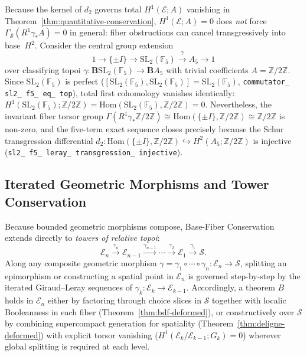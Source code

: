 \begin{remark}\label{rem:leray-transgressive-cancellation}%
%
%
Because the kernel of $d_2$ governs total $H^1(\mathcal{E}; A)$ vanishing in Theorem~\ref{thm:quantitative-conservation}, $H^1(\mathcal{E}; A) = 0$ does \emph{not} force $\Gamma_{\mathcal{S}}(R^1\gamma_* A) = 0$ in general: fiber obstructions can cancel transgressively into base~$H^2$. Consider the central group extension
\[
  1 \longrightarrow \{\pm I\} \longrightarrow \mathrm{SL}_2(\mathbb{F}_5) \xrightarrow{\;\gamma\;} A_5 \longrightarrow 1
\]
over classifying topoi $\gamma : \mathbf{B}\mathrm{SL}_2(\mathbb{F}_5) \to \mathbf{B}A_5$ with trivial coefficients $A = \mathbb{Z}/2\mathbb{Z}$. Since $\mathrm{SL}_2(\mathbb{F}_5)$ is perfect ($[\mathrm{SL}_2(\mathbb{F}_5), \mathrm{SL}_2(\mathbb{F}_5)] = \mathrm{SL}_2(\mathbb{F}_5)$, \texttt{commutator\_ sl2\_ f5\_ eq\_ top}), total first cohomology vanishes identically: $H^1(\mathrm{SL}_2(\mathbb{F}_5); \mathbb{Z}/2\mathbb{Z}) = \mathrm{Hom}(\mathrm{SL}_2(\mathbb{F}_5), \mathbb{Z}/2\mathbb{Z}) = 0$. Nevertheless, the invariant fiber torsor group $\Gamma(R^1\gamma_* \mathbb{Z}/2\mathbb{Z}) \cong \mathrm{Hom}(\{\pm I\}, \mathbb{Z}/2\mathbb{Z}) \cong \mathbb{Z}/2\mathbb{Z}$ is non-zero, and the five-term exact sequence closes precisely because the Schur transgression differential $d_2 : \mathrm{Hom}(\{\pm I\}, \mathbb{Z}/2\mathbb{Z}) \hookrightarrow H^2(A_5; \mathbb{Z}/2\mathbb{Z})$ is injective (\texttt{sl2\_ f5\_ leray\_ transgression\_ injective}).
\end{remark}

\subsection{Iterated Geometric Morphisms and Tower Conservation}

Because bounded geometric morphisms compose, Base-Fiber Conservation extends directly to \emph{towers of relative topoi}:
\[
  \mathcal{E}_n \xrightarrow{\gamma_n} \mathcal{E}_{n-1} \xrightarrow{\gamma_{n-1}} \cdots \xrightarrow{\gamma_2} \mathcal{E}_1 \xrightarrow{\gamma_1} \mathcal{S}.
\]
Along any composite geometric morphism $\gamma = \gamma_1 \circ \cdots \circ \gamma_n : \mathcal{E}_n \to \mathcal{S}$, splitting an epimorphism or constructing a spatial point in $\mathcal{E}_n$ is governed step-by-step by the iterated Giraud--Leray sequences of $\gamma_k : \mathcal{E}_k \to \mathcal{E}_{k-1}$. Accordingly, a theorem $B$ holds in $\mathcal{E}_n$ either by factoring through choice slices in $\mathcal{S}$ together with localic Booleanness in each fiber (Theorem~\ref{thm:bdf-deformed}), or constructively over $\mathcal{S}$ by combining supercompact generation for spatiality (Theorem~\ref{thm:deligne-deformed}) with explicit torsor vanishing ($H^1(\mathcal{E}_k/\mathcal{E}_{k-1}; G_k) = 0$) wherever global splitting is required at each level.

